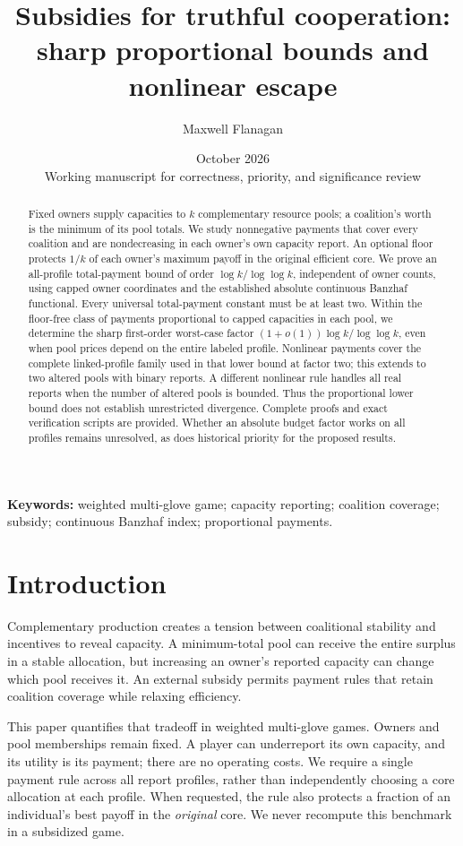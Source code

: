 \documentclass[11pt]{article}
\title{Subsidies for truthful cooperation:\\sharp proportional bounds and nonlinear escape}
\author{Maxwell Flanagan}
\date{October 2026\\[3pt]\small Working manuscript for correctness, priority, and significance review}
\theoremstyle{definition}\newtheorem{definition}[theorem]{Definition}
\theoremstyle{remark}\newtheorem{remark}[theorem]{Remark}
\begin{document}
\maketitle
\begin{abstract}
Fixed owners supply capacities to $k$ complementary resource pools; a
coalition's worth is the minimum of its pool totals. We study nonnegative
payments that cover every coalition and are nondecreasing in each owner's
own capacity report. An optional floor protects $1/k$ of each owner's maximum
payoff in the original efficient core. We prove an all-profile total-payment
bound of order $\log k/\log\log k$, independent of owner counts, using capped
owner coordinates and the established absolute continuous Banzhaf functional.
Every universal total-payment constant must be at least two. Within the
floor-free class of payments proportional to capped capacities in each pool,
we determine the sharp first-order worst-case factor
$(1+o(1))\log k/\log\log k$, even when pool prices depend on the entire labeled
profile. Nonlinear payments cover the complete linked-profile family used
in that lower bound at factor two; this extends to two altered pools with
binary reports. A different nonlinear rule handles all real reports when the
number of altered pools is bounded. Thus the proportional lower bound does
not establish unrestricted divergence. Complete proofs and exact verification
scripts are provided. Whether an absolute budget factor works on all profiles
remains unresolved, as does historical priority for the proposed results.
\end{abstract}
\noindent\textbf{Keywords:} weighted multi-glove game; capacity reporting;
coalition coverage; subsidy; continuous Banzhaf index; proportional payments.

\section{Introduction}
Complementary production creates a tension between coalitional stability and
incentives to reveal capacity. A minimum-total pool can receive the entire
surplus in a stable allocation, but increasing an owner's reported capacity
can change which pool receives it. An external subsidy permits payment rules
that retain coalition coverage while relaxing efficiency.

This paper quantifies that tradeoff in weighted multi-glove games. Owners and
pool memberships remain fixed. A player can underreport its own capacity,
and its utility is its payment; there are no operating costs. We require a
single payment rule across all report profiles, rather than independently
choosing a core allocation at each profile. When requested, the rule also
protects a fraction of an individual's best payoff in the \emph{original}
core. We never recompute this benchmark in a subsidized game.
\end{document}
